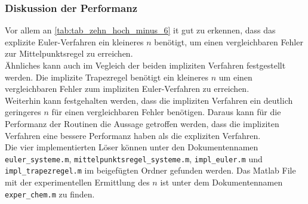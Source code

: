 \documentclass[
	pagesize,
	fontsize=12pt,
	paper=a4,
	oneside,
   reqno
]{scrartcl}
\begin{document}
\begin{table}[H]
   \centering
   \caption[$n$-Bestimmung bei max. abs. Fehler von $10^{-6}$]{Experimentelle Bestimmung von $n$ bei einem maximalen Fehler von $10^{-6}$}
   \label{tab:tab_zehn_hoch_minus_6}
\end{table}

\subsubsection{Diskussion der Performanz}

Vor allem an \autoref{tab:tab_zehn_hoch_minus_6} it gut zu erkennen, dass das explizite Euler-Verfahren ein kleineres $n$  benötigt, um einen vergleichbaren Fehler zur Mittelpunktsregel zu erreichen. \\
Ähnliches kann auch im Vegleich der beiden impliziten Verfahren festgestellt werden. Die implizite Trapezregel benötigt ein kleineres $n$ um einen vergleichbaren Fehler zum impliziten Euler-Verfahren zu erreichen. \\
Weiterhin kann festgehalten werden, dass die impliziten Verfahren ein deutlich geringeres $n$ für einen vergleichbaren Fehler benötigen. Daraus kann für die Performanz der Routinen die Aussage getroffen werden, dass die impliziten Verfahren eine bessere Performanz haben als die expliziten Verfahren.\\

Die vier implementierten Löser können unter den Dokumentennamen \texttt{euler\_systeme.m}, \texttt{mittelpunktsregel\_systeme.m}, \texttt{impl\_euler.m} und \texttt{impl\_trapezregel.m} im beigefügten Ordner gefunden werden. Das Matlab File mit der experimentellen Ermittlung des $n$ ist unter dem Dokumentennamen \texttt{exper\_chem.m} zu finden.
\end{document}
